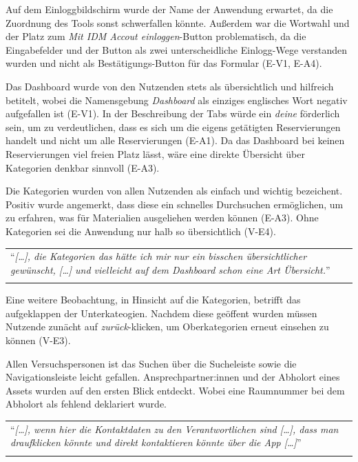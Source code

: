 Auf dem Einloggbildschirm wurde der Name der Anwendung erwartet, da die
Zuordnung des Tools sonst schwerfallen könnte. Außerdem war die Wortwahl und der
Platz zum \textit{Mit IDM Accout einloggen}-Button problematisch, da die
Eingabefelder und der Button als zwei unterscheidliche Einlogg-Wege verstanden
wurden und nicht als Bestätigungs-Button für das Formular (E-V1, E-A4).

Das Dashboard wurde von den Nutzenden stets als übersichtlich und hilfreich
betitelt, wobei die Namensgebung \textit{Dashboard} als einziges englisches
Wort negativ aufgefallen ist (E-V1). In der Beschreibung der Tabs würde ein
\textit{deine} förderlich sein, um zu verdeutlichen, dass es sich um die eigens
getätigten Reservierungen handelt und nicht um alle Reservierungen (E-A1). Da
das Dashboard bei keinen Reservierungen viel freien Platz lässt, wäre eine
direkte Übersicht über Kategorien denkbar sinnvoll (E-A3).

Die Kategorien wurden von allen Nutzenden als einfach und wichtig bezeichent.
Positiv wurde angemerkt, dass diese ein schnelles Durchsuchen ermöglichen, um zu
erfahren, was für Materialien ausgeliehen werden können (E-A3). Ohne Kategorien
sei die Anwendung nur halb so übersichtlich (V-E4).

\begin{longtable}{p{}} \arrayrulecolor{maincolor}\hline
  \enquote{\textit{[\dots], die Kategorien das hätte ich mir nur ein bisschen
      übersichtlicher gewünscht, [\dots] und vielleicht auf dem Dashboard schon eine
  Art Übersicht.}} \\
  \arrayrulecolor{maincolor}\hline
\end{longtable}

Eine weitere Beobachtung, in Hinsicht auf die Kategorien, betrifft das
aufgeklappen der Unterkateogien. Nachdem diese geöffent wurden müssen Nutzende
zunächt auf \textit{zurück}-klicken, um Oberkategorien erneut einsehen zu können
(V-E3).

Allen Versuchspersonen ist das Suchen über die Sucheleiste sowie die
Navigationsleiste leicht gefallen. Ansprechpartner:innen und der Abholort eines
Assets wurden auf den ersten Blick entdeckt. Wobei eine Raumnummer bei dem
Abholort als fehlend deklariert wurde.

\begin{longtable}{p{}} \arrayrulecolor{maincolor}\hline
  \enquote{\textit{[\dots], wenn hier die Kontaktdaten zu den Verantwortlichen
      sind [\dots], dass man draufklicken könnte und direkt kontaktieren könnte
  über die App [\dots]}} \\
  \arrayrulecolor{maincolor}\hline
\end{longtable}


